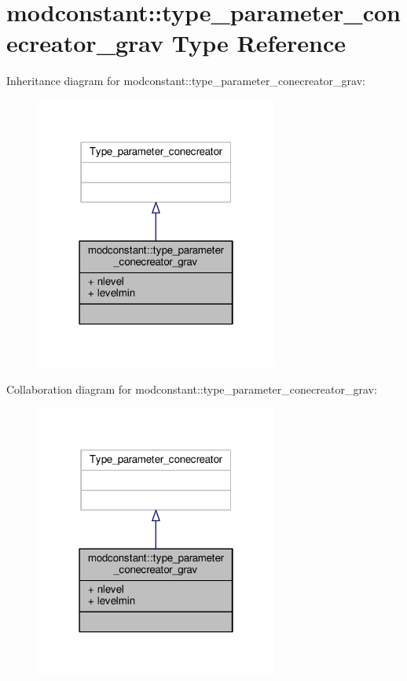 \hypertarget{structmodconstant_1_1type__parameter__conecreator__grav}{}\section{modconstant\+:\+:type\+\_\+parameter\+\_\+conecreator\+\_\+grav Type Reference}
\label{structmodconstant_1_1type__parameter__conecreator__grav}


Inheritance diagram for modconstant\+:\+:type\+\_\+parameter\+\_\+conecreator\+\_\+grav\+:\nopagebreak
\begin{figure}[H]
\begin{center}
\leavevmode
\includegraphics[width=226pt]{structmodconstant_1_1type__parameter__conecreator__grav__inherit__graph}
\end{center}
\end{figure}


Collaboration diagram for modconstant\+:\+:type\+\_\+parameter\+\_\+conecreator\+\_\+grav\+:\nopagebreak
\begin{figure}[H]
\begin{center}
\leavevmode
\includegraphics[width=226pt]{structmodconstant_1_1type__parameter__conecreator__grav__coll__graph}
\end{center}
\end{figure}
